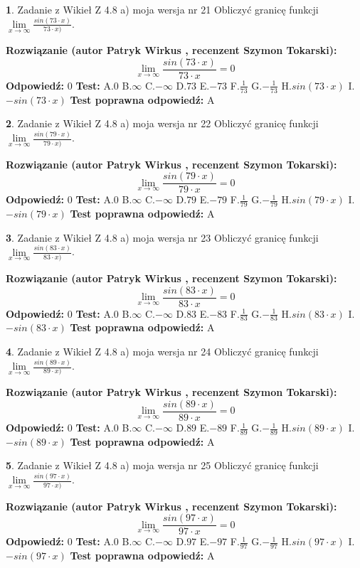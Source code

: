\documentclass[12pt, a4paper]{article}
\theoremstyle{definition} %
\newtheorem{zad}{}
\newcommand{\zadStart}[1]{\begin{zad}#1\newline}
\newcommand{\zadStop}{\end{zad}}
\newcommand{\rozwStart}[2]{\noindent \textbf{Rozwiązanie (autor #1 , recenzent #2): }\newline}
\newcommand{\rozwStop}{\newline}
\newcommand{\odpStart}{\noindent \textbf{Odpowiedź:}\newline}
\newcommand{\odpStop}{\newline}
\newcommand{\testStart}{\noindent \textbf{Test:}\newline}
\newcommand{\testStop}{\newline}
\newcommand{\kluczStart}{\noindent \textbf{Test poprawna odpowiedź:}\newline}
\newcommand{\kluczStop}{\newline}
\begin{document}
\zadStart{Zadanie z Wikieł Z 4.8 a) moja wersja nr 21}
Obliczyć granicę funkcji $\lim\limits_{x\to \infty}\frac{sin(73\cdot x)}{73\cdot x)}$.
\zadStop
\rozwStart{Patryk Wirkus}{Szymon Tokarski}
$$\lim\limits_{x\to \infty}\frac{sin(73\cdot x)}{73\cdot x}=
0$$
\rozwStop
\odpStart
$0$
\odpStop
\testStart
A.$0$ B.$\infty$ C.$-\infty$ D.$73$ E.$-73$
F.$\frac{1}{73}$ G.$-\frac{1}{73}$
H.$sin(73\cdot x)$
I.$-sin(73\cdot x)$
\testStop
\kluczStart
A
\kluczStop



\zadStart{Zadanie z Wikieł Z 4.8 a) moja wersja nr 22}
Obliczyć granicę funkcji $\lim\limits_{x\to \infty}\frac{sin(79\cdot x)}{79\cdot x)}$.
\zadStop
\rozwStart{Patryk Wirkus}{Szymon Tokarski}
$$\lim\limits_{x\to \infty}\frac{sin(79\cdot x)}{79\cdot x}=
0$$
\rozwStop
\odpStart
$0$
\odpStop
\testStart
A.$0$ B.$\infty$ C.$-\infty$ D.$79$ E.$-79$
F.$\frac{1}{79}$ G.$-\frac{1}{79}$
H.$sin(79\cdot x)$
I.$-sin(79\cdot x)$
\testStop
\kluczStart
A
\kluczStop



\zadStart{Zadanie z Wikieł Z 4.8 a) moja wersja nr 23}
Obliczyć granicę funkcji $\lim\limits_{x\to \infty}\frac{sin(83\cdot x)}{83\cdot x)}$.
\zadStop
\rozwStart{Patryk Wirkus}{Szymon Tokarski}
$$\lim\limits_{x\to \infty}\frac{sin(83\cdot x)}{83\cdot x}=
0$$
\rozwStop
\odpStart
$0$
\odpStop
\testStart
A.$0$ B.$\infty$ C.$-\infty$ D.$83$ E.$-83$
F.$\frac{1}{83}$ G.$-\frac{1}{83}$
H.$sin(83\cdot x)$
I.$-sin(83\cdot x)$
\testStop
\kluczStart
A
\kluczStop



\zadStart{Zadanie z Wikieł Z 4.8 a) moja wersja nr 24}
Obliczyć granicę funkcji $\lim\limits_{x\to \infty}\frac{sin(89\cdot x)}{89\cdot x)}$.
\zadStop
\rozwStart{Patryk Wirkus}{Szymon Tokarski}
$$\lim\limits_{x\to \infty}\frac{sin(89\cdot x)}{89\cdot x}=
0$$
\rozwStop
\odpStart
$0$
\odpStop
\testStart
A.$0$ B.$\infty$ C.$-\infty$ D.$89$ E.$-89$
F.$\frac{1}{89}$ G.$-\frac{1}{89}$
H.$sin(89\cdot x)$
I.$-sin(89\cdot x)$
\testStop
\kluczStart
A
\kluczStop



\zadStart{Zadanie z Wikieł Z 4.8 a) moja wersja nr 25}
Obliczyć granicę funkcji $\lim\limits_{x\to \infty}\frac{sin(97\cdot x)}{97\cdot x)}$.
\zadStop
\rozwStart{Patryk Wirkus}{Szymon Tokarski}
$$\lim\limits_{x\to \infty}\frac{sin(97\cdot x)}{97\cdot x}=
0$$
\rozwStop
\odpStart
$0$
\odpStop
\testStart
A.$0$ B.$\infty$ C.$-\infty$ D.$97$ E.$-97$
F.$\frac{1}{97}$ G.$-\frac{1}{97}$
H.$sin(97\cdot x)$
I.$-sin(97\cdot x)$
\testStop
\kluczStart
A
\kluczStop
\end{document}
